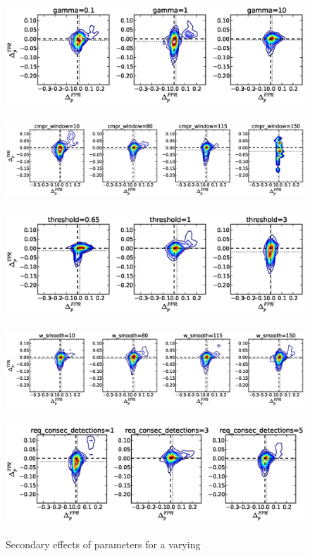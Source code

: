\begin{figure}[!h]
\begin{center}
\includegraphics[height=1.5in]{../fig/final/delta_hist_sec/detection_window_hrs/gamma}
\includegraphics[height=1.5in]{../fig/final/delta_hist_sec/detection_window_hrs/cmpr_window}
\includegraphics[height=1.5in]{../fig/final/delta_hist_sec/detection_window_hrs/threshold}
\includegraphics[height=1.5in]{../fig/final/delta_hist_sec/detection_window_hrs/w_smooth}
\includegraphics[height=1.5in]{../fig/final/delta_hist_sec/detection_window_hrs/req_consec_detections}
\end{center}
\caption{\label{fig:delta_sec5} Secondary effects of parameters for a varying }
\end{figure}


